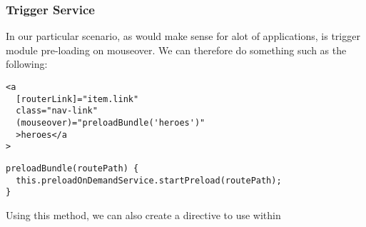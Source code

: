 \subsubsection{Trigger Service}
In our particular scenario, as would make sense for alot of applications, is trigger 
module pre-loading on mouseover. We can therefore do something such as the following: 
\begin{lstlisting}
<a
  [routerLink]="item.link"
  class="nav-link"
  (mouseover)="preloadBundle('heroes')"
  >heroes</a
>  
\end{lstlisting}

\begin{lstlisting}
preloadBundle(routePath) {
  this.preloadOnDemandService.startPreload(routePath);
}
\end{lstlisting}

Using this method, we can also create a directive to use within 
